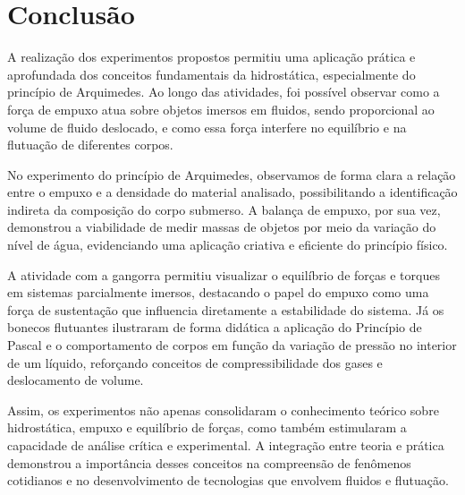 \section{Conclusão}

A realização dos experimentos propostos permitiu uma aplicação prática e aprofundada dos conceitos fundamentais da hidrostática, especialmente do princípio de Arquimedes. Ao longo das atividades, foi possível observar como a força de empuxo atua sobre objetos imersos em fluidos, sendo proporcional ao volume de fluido deslocado, e como essa força interfere no equilíbrio e na flutuação de diferentes corpos.

No experimento do princípio de Arquimedes, observamos de forma clara a relação entre o empuxo e a densidade do material analisado, possibilitando a identificação indireta da composição do corpo submerso. A balança de empuxo, por sua vez, demonstrou a viabilidade de medir massas de objetos por meio da variação do nível de água, evidenciando uma aplicação criativa e eficiente do princípio físico.

A atividade com a gangorra permitiu visualizar o equilíbrio de forças e torques em sistemas parcialmente imersos, destacando o papel do empuxo como uma força de sustentação que influencia diretamente a estabilidade do sistema. Já os bonecos flutuantes ilustraram de forma didática a aplicação do Princípio de Pascal e o comportamento de corpos em função da variação de pressão no interior de um líquido, reforçando conceitos de compressibilidade dos gases e deslocamento de volume.

Assim, os experimentos não apenas consolidaram o conhecimento teórico sobre hidrostática, empuxo e equilíbrio de forças, como também estimularam a capacidade de análise crítica e experimental. A integração entre teoria e prática demonstrou a importância desses conceitos na compreensão de fenômenos cotidianos e no desenvolvimento de tecnologias que envolvem fluidos e flutuação.



